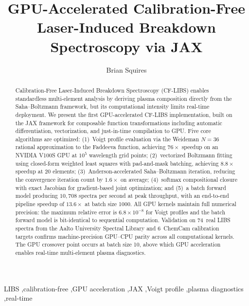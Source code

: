 \documentclass[preprint,12pt,authoryear]{elsarticle}
\begin{document}
\begin{frontmatter}

\title{GPU-Accelerated Calibration-Free Laser-Induced Breakdown Spectroscopy via JAX}

\author[inst1]{Brian Squires}

\begin{keyword}
LIBS \sep calibration-free \sep GPU acceleration \sep JAX \sep Voigt profile \sep plasma diagnostics \sep real-time
\end{keyword}

\begin{abstract}
Calibration-Free Laser-Induced Breakdown Spectroscopy (CF-LIBS) enables standardless multi-element analysis by deriving plasma composition directly from the Saha--Boltzmann framework, but its computational intensity limits real-time deployment.
We present the first GPU-accelerated CF-LIBS implementation, built on the JAX framework for composable function transformations including automatic differentiation, vectorization, and just-in-time compilation to GPU.
Five core algorithms are optimized: (1)~Voigt profile evaluation via the Weideman $N\!=\!36$ rational approximation to the Faddeeva function, achieving $76\times$ speedup on an NVIDIA V100S GPU at $10^5$ wavelength grid points; (2)~vectorized Boltzmann fitting using closed-form weighted least squares with pad-and-mask batching, achieving $8.8\times$ speedup at 20 elements; (3)~Anderson-accelerated Saha--Boltzmann iteration, reducing the convergence iteration count by $1.6\times$ on average; (4)~softmax compositional closure with exact Jacobian for gradient-based joint optimization; and (5)~a batch forward model producing $10{,}708$ spectra per second at peak throughput, with an end-to-end pipeline speedup of $13.6\times$ at batch size 1000.
All GPU kernels maintain full numerical precision: the maximum relative error is $6.8 \times 10^{-8}$ for Voigt profiles and the batch forward model is bit-identical to sequential computation.
Validation on 74~real LIBS spectra from the Aalto University Spectral Library and 6~ChemCam calibration targets confirms machine-precision GPU--CPU parity across all computational kernels.
The GPU crossover point occurs at batch size 10, above which GPU acceleration enables real-time multi-element plasma diagnostics.
\end{abstract}

\end{frontmatter}
\end{document}
